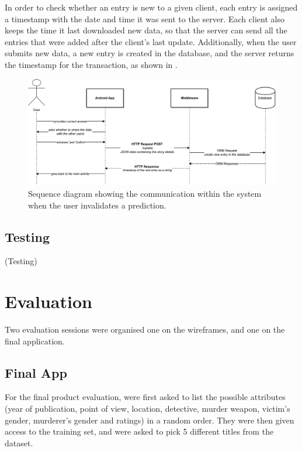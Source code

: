 \documentclass{mproj}
\begin{document}
In order to check whether an entry is new to a given client, each entry is assigned a timestamp with the date and time it was sent to the server. Each client also keeps the time it last downloaded new data, so that the server can send all the entries that were added after the client's last update. Additionally, when the user submits new data, a new entry is created in the database, and the server returns the timestamp for the transaction, as shown in .
\begin{figure}[h]
	\centering
	\includegraphics[width=\textwidth]{images/wrong_prediction_diagram}
	\caption{Sequence diagram showing the communication within the system when the user invalidates a prediction.}
	\label{fig:new_entry}
\end{figure}

\section{Testing}

(Testing)

\chapter{Evaluation}\label{evaluation}

Two evaluation sessions were organised one on the wireframes, and one on the final application. 



\section{Final App}

For the final product evaluation,  were first asked to list the possible attributes (year of publication, point of view, location, detective, murder weapon, victim's gender, murderer's gender and ratings) in a random order. They were then given access to the training set, and were asked to pick 5 different titles from the dataset. \par
\end{document}
